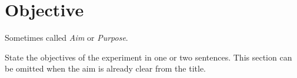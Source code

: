 \section{Objective}
Sometimes called \emph{Aim} or \emph{Purpose}.

State the objectives of the experiment in one or two sentences. This section can be omitted when the aim is already clear from the title.
